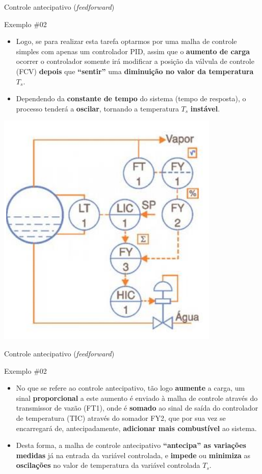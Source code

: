 \begin{frame}{Controle antecipativo (\textit{feedforward})}
	\begin{block}{Exemplo \#02}
		\begin{itemize}
			\item Logo, se para realizar esta tarefa optarmos por uma malha de controle simples com apenas um controlador PID, assim que o \textbf{aumento de carga} ocorrer o controlador somente irá modificar a posição da válvula de controle (FCV) \textbf{depois} que \textbf{``sentir''} uma \textbf{diminuição no valor da temperatura} $ T_s $.
			\item Dependendo da \textbf{constante de tempo} do sistema (tempo de resposta), o processo tenderá a \textbf{oscilar}, tornando a temperatura $ T_s $ \textbf{instável}.
		\end{itemize}
	\end{block}
	
	\centering
	\includegraphics[height=0.45\textheight]{Figuras/Ch15/fig2}
\end{frame}


\begin{frame}{Controle antecipativo (\textit{feedforward})}
	\begin{block}{Exemplo \#02}
		\begin{itemize}
			\item No que se refere ao controle antecipativo, tão logo \textbf{aumente} a carga, um sinal \textbf{proporcional} a este aumento é enviado à malha de controle através do transmissor de vazão (FT1), onde é \textbf{somado} ao sinal de saída do controlador de temperatura (TIC) através do somador FY2, que por sua vez se encarregará de, antecipadamente, \textbf{adicionar mais combustível} ao sistema.
			\item Desta forma, a malha de controle antecipativo \textbf{``antecipa'' as variações medidas} já na entrada da variável controlada, e \textbf{impede} ou \textbf{minimiza} as \textbf{oscilações} no valor de temperatura da variável controlada $ T_s $.
		\end{itemize}
	\end{block}
\end{frame}



